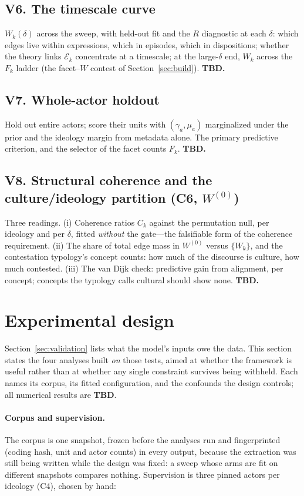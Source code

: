 \documentclass[11pt]{article}
\newcommand{\Ecal}{\mathcal{E}}
\newcommand{\1}{\mathbb{1}}
\begin{document}
\subsection*{V6. The timescale curve}
$W_k(\delta)$ across the sweep, with held-out fit and the $R$ diagnostic at each $\delta$: which edges live within expressions, which in episodes, which in dispositions; whether the theory links $\Ecal_k$ concentrate at a timescale; at the large-$\delta$ end, $W_k$ across the $F_k$ ladder (the facet--$W$ contest of Section~\ref{sec:build}). \textbf{TBD.}

\subsection*{V7. Whole-actor holdout}
Hold out entire actors; score their units with $(\gamma_a,\mu_a)$ marginalized under the prior and the ideology margin from metadata alone. The primary predictive criterion, and the selector of the facet counts $F_k$. \textbf{TBD.}

\subsection*{V8. Structural coherence and the culture/ideology partition (C6, $W^{(0)}$)}
Three readings. (i) Coherence ratios $C_k$ against the permutation null, per ideology and per $\delta$, fitted \emph{without} the gate---the falsifiable form of the coherence requirement. (ii) The share of total edge mass in $W^{(0)}$ versus $\{W_k\}$, and the contestation typology's concept counts: how much of the discourse is culture, how much contested. (iii) The van Dijk check: predictive gain from alignment, per concept; concepts the typology calls cultural should show none. \textbf{TBD.}

\section{Experimental design}\label{sec:experiments}

Section~\ref{sec:validation} lists what the model's inputs owe the data. This section
states the four analyses built \emph{on} those tests, aimed at whether the framework is
useful rather than at whether any single constraint survives being withheld. Each names its
corpus, its fitted configuration, and the confounds the design controls; all numerical
results are \textbf{TBD}.

\paragraph{Corpus and supervision.} The corpus is one snapshot, frozen before the analyses
run and fingerprinted (coding hash, unit and actor counts) in every output, because the
extraction was still being written while the design was fixed: a sweep whose arms are fit on
different snapshots compares nothing. Supervision is three pinned actors per ideology (C4),
chosen by hand:
\end{document}
